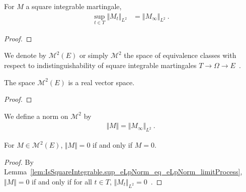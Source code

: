 \begin{lemma}\label{lem:IsSquareIntegrable.sup_eLpNorm_eq_eLpNorm_limitProcess}
For $M$ a square integrable martingale,
\begin{align*}
  \sup_{t \in T} \Vert M_t \Vert_{L^2}
  &= \Vert M_\infty \Vert_{L^2}
  \: .
\end{align*}
\end{lemma}

\begin{proof}

\end{proof}


\begin{definition}\label{def:L2Martingales}
We denote by $\mathcal{M}^2(E)$ or simply $\mathcal{M}^2$ the space of equivalence classes with respect to indistinguishability of square integrable martingales $T \to \Omega \to E$~.
\end{definition}


\begin{lemma}\label{lem:L2Martingales.module}
The space $\mathcal{M}^2(E)$ is a real vector space.
\end{lemma}

\begin{proof}

\end{proof}


\begin{definition}\label{def:L2Martingales.norm}
We define a norm on $\mathcal{M}^2$ by
\begin{align*}
  \Vert M \Vert = \Vert M_\infty \Vert_{L^2}
  \: .
\end{align*}
\end{definition}


\begin{lemma}\label{lem:L2Martingales.norm_eq_zero}
For $M \in \mathcal{M}^2(E)$, $\Vert M \Vert = 0$ if and only if $M = 0$.
\end{lemma}

\begin{proof}
By Lemma~\ref{lem:IsSquareIntegrable.sup_eLpNorm_eq_eLpNorm_limitProcess}, $\Vert M \Vert = 0$ if and only if for all $t \in T$, $\Vert M_t \Vert_{L^2} = 0$~.
\end{proof}


